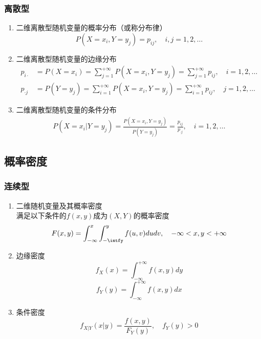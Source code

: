 \subsubsection{离散型}
\begin{enumerate}
	\item 二维离散型随机变量的概率分布（或称分布律）
	\begin{equation}
		P(X=x_i, Y=y_j) = p_{ij}, \quad i,j = 1, 2, \dots
	\end{equation}

	\item 二维离散型随机变量的边缘分布
	\begin{align}
		p_{i\cdot} &= P(X=x_i) 
		= \sum_{j=1}^{+\infty}P(X=x_i, Y=y_j) 
		= \sum_{j=1}^{+\infty}p_{ij}, \quad i = 1, 2, \dots \\
		p_{\cdot j} &= P(Y=y_j) 
		= \sum_{i=1}^{+\infty}P(X=x_i, Y=y_j) 
		= \sum_{i=1}^{+\infty}p_{ij}, \quad j = 1, 2, \dots 
	\end{align}
	\item 二维离散型随机变量的条件分布
	\begin{equation}\begin{aligned}
		P(X=x_i|Y=y_j) = \frac{P(X=x_i, Y=y_j)}{P(Y=y_j)} = \frac{p_{ij}}{p_{\cdot j}}, \quad i = 1, 2, \dots
	\end{aligned}\end{equation}


\end{enumerate}

\subsection{概率密度}
\subsubsection{连续型}
\begin{enumerate}
	\item 二维随机变量及其概率密度 \\
	满足以下条件的$f(x, y)$成为$(X, Y)$的概率密度
	\begin{equation}
		F(x, y) = \int_{-\infty}^{x} \int_{-\intfy}^{y}f(u, v)dudv, \quad -\infty <x, y < +\infty
	\end{equation}
	\item 边缘密度
	\begin{equation}
		f_X(x) = \int_{-\infty}^{+\infty}f(x, y)dy
	\end{equation}
	\begin{equation}
		f_Y(y) = \int_{-\infty}^{+\infty}f(x, y)dx
	\end{equation}
	\item 条件密度
	\begin{equation}
		f_{X|Y}(x|y) = \frac{f(x,y)}{F_Y(y)}, \quad f_Y(y) > 0
	\end{equation}
\end{enumerate}


